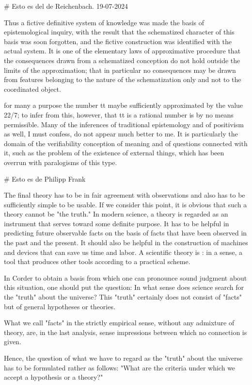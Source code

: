 # Esto es del de Reichenbach. 19-07-2024

Thus a fictive definitive system of knowledge was made the basis of
epistemological inquiry, with the result that the schematized character of this
basis was soon forgotten, and the fictive construction was identified with the
actual system. It is one of the elementary laws of approximative procedure that
the consequences drawn from a schematized conception do not hold outside the
limits of the approximation; that in particular no consequences may be drawn
from features belonging to the nature of the schematization only and not to the
coordinated object.

for many a purpose the number tt maybe sufficiently approximated by the value
22/7; to infer from this, however, that tt is a rational number is by no means
permissible. Many of the inferences of traditional epistemology and of
positivism as well, I must confess, do not appear much better to me. It is
particularly the domain of the verifiability conception of meaning and of
questions connected with it, such as the problem of the existence of external
things, which has been overrun with paralogisms of this type.


# Esto es de Philipp Frank

The final theory has to be in fair agreement with observations and also has to
be sufficiently simple to be usable. If we consider this point, it is obvious
that such a theory cannot be "the truth." In modern science, a theory is
regarded as an instrument that serves toward some definite purpose. It has to be
helpful in predicting future observable facts on the basis of facts that have
been observed in the past and the present. It should also be helpful in the
construction of machines and devices that can save us time and labor. A
scientific theory is : in a sense, a tool that produces other tools according to
a practical scheme.

In Corder to obtain a basis from which one can pronounce sound judgment about
this situation, one should put the question: In what sense does science search
for the "truth" about the universe? This "truth" certainly does not consist of
"facts" but of general hypotheses or theories.

What we call "facts" in the strictly empirical sense, without any admixture of
theory, are, in the last analysis, sense impressions between which no connection
is given.

Hence, the question of what we have to regard as the "truth" about the universe
has to be formulated rather as follows: "What are the criteria under which we
accept a hypothesis or a theory?"

